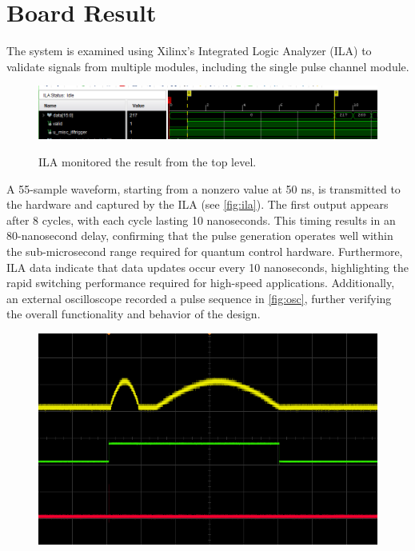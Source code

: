 \section{Board Result}
The system is examined using Xilinx's Integrated Logic Analyzer (ILA) to validate signals from multiple modules, including the single pulse channel module.  
\begin{figure}[h]
    \centering
    \includegraphics[width=1\linewidth]{figures/ila.png}
    \caption{ILA monitored the result from the top level.}
    \setlength{\abovecaptionskip}{5pt}    %
    \setlength{\belowcaptionskip}{5pt}    %
    \label{fig:ila}
\end{figure}

A 55-sample waveform, starting from a nonzero value at 50 ns, is transmitted to the hardware and captured by the ILA (see \autoref{fig:ila}). The first output appears after 8 cycles, with each cycle lasting 10 nanoseconds. This timing results in an 80-nanosecond delay, confirming that the pulse generation operates well within the sub-microsecond range required for quantum control hardware. Furthermore, ILA data indicate that data updates occur every 10 nanoseconds, highlighting the rapid switching performance required for high-speed applications. Additionally, an external oscilloscope recorded a pulse sequence in \autoref{fig:osc}, further verifying the overall functionality and behavior of the design.
\begin{figure}[h]
    \centering
    \includegraphics[width=.7\linewidth]{figures/one_trig_seq.png}
    \caption{}
    \setlength{\abovecaptionskip}{5pt}    %
    \setlength{\belowcaptionskip}{5pt}    %
    \label{fig:osc}
\end{figure}

